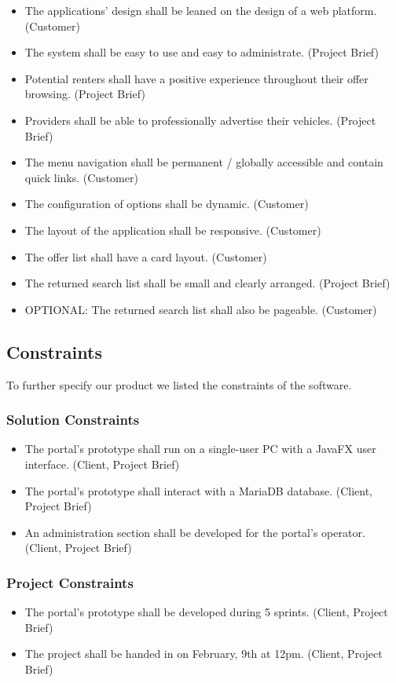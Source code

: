 \begin{itemize}
    \item The applications' design shall be leaned on the design of a web platform. (Customer)
    \item The system shall be easy to use and easy to administrate. (Project Brief)
    \item Potential renters shall have a positive experience throughout their offer browsing. (Project Brief)
    \item Providers shall be able to professionally advertise their vehicles. (Project Brief)
    \item The menu navigation shall be permanent / globally accessible and contain quick links. (Customer)
    \item The configuration of options shall be dynamic. (Customer)
    \item The layout of the application shall be responsive. (Customer)
    \item The offer list shall have a card layout. (Customer)
    \item The returned search list shall be small and clearly arranged. (Project Brief)
    \item OPTIONAL: The returned search list shall also be pageable. (Customer)
\end{itemize}


\subsection{Constraints}
To further specify our product we listed the constraints of the software.
\subsubsection{Solution Constraints}
\begin{itemize}
    \item The portal's prototype shall run on a single-user PC with a JavaFX user interface. (Client, Project Brief)
    \item The portal's prototype shall interact with a MariaDB database. (Client, Project Brief)
    \item An administration section shall be developed for the portal's operator. (Client, Project Brief)
\end{itemize}
\subsubsection{Project Constraints}
\begin{itemize}
    \item The portal's prototype shall be developed during 5 sprints. (Client, Project Brief)
    \item The project shall be handed in on February, 9th at 12pm. (Client, Project Brief)
\end{itemize}
